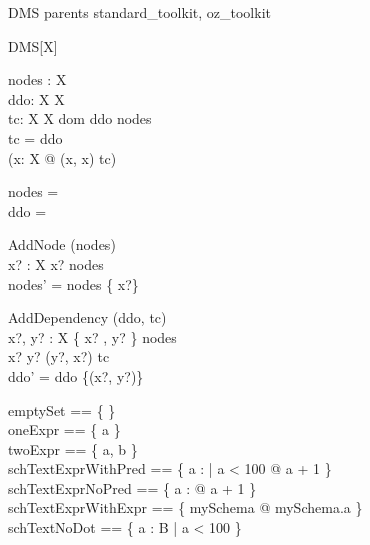 \zsection DMS parents standard\_toolkit, oz\_toolkit\\

\begin{class}{DMS}[X]

\begin{state}
  nodes : \finset X\\
  ddo: X \rel X\\
  tc:  X \rel X  
\where
  dom ddo \subseteq nodes \\ 
  tc = ddo \star \\
  \lnot (\exists x:  X @ (x, x) \in tc)
\end{state}

\begin{init}
  nodes = \emptyset \\
  ddo = \emptyset
\end{init}

\begin{schema}{AddNode}
  \Delta (nodes)\\
  x? : X
\where
  x? \notin nodes\\ 
  nodes' = nodes \cup \{ x?\} 
\end{schema}

\begin{schema}{AddDependency}
  \Delta (ddo, tc)\\
  x?, y? : X
\where
  \{ x? , y? \} \notin nodes\\
  x? \neq y? \land (y?, x?) \notin tc \\ 
  ddo' = ddo \cup \{(x?, y?)\}
\end{schema}

\end{class}

\begin{zed}
  emptySet == \{ \}\\
  oneExpr == \{ a \}\\
  twoExpr == \{ a, b \}\\
  schTextExprWithPred == \{ a : \nat | a < 100 @ a + 1 \}\\
  schTextExprNoPred == \{ a : \nat @ a + 1 \}\\
  schTextExprWithExpr == \{ mySchema @ mySchema.a \}\\
  schTextNoDot == \{ a : B | a < 100 \}
\end{zed}
